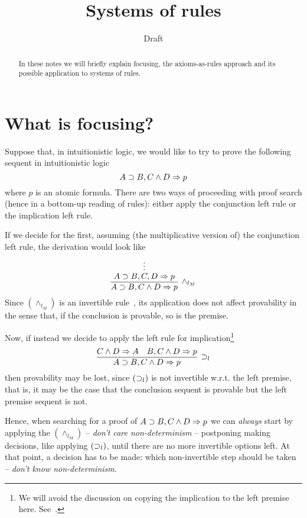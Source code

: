 \documentclass{llncs}
\title{Systems of rules}
\author{Draft}
\institute{\today}
\begin{document}
\maketitle

\begin{abstract}
In these notes we will briefly explain focusing, the axioms-as-rules approach and its possible application to systems of rules.
\end{abstract}

\section{What is focusing?}
Suppose that, in intuitionistic logic, we would like to try to prove the following sequent in intuitionistic logic
\[
A\supset B, C\wedge D\Rightarrow p
\]
where $p$ is an atomic formula. There are two ways of proceeding with proof search (hence in a bottom-up reading of rules): either apply the conjunction left rule or the implication left rule.

If we decide for the first, assuming (the multiplicative version of) the conjunction left rule, the derivation would look like
\[
\infer[\wedge_{l_M}]{A\iimp B, C\wedge D\seq p}
{\deduce{A\iimp B, C, D\seq p}{
\deduce{}{\vdots}}}
\] 
Since $(\wedge_{l_M})$ is an invertible rule~\cite{troelstra00book}, its application does not affect provability in the sense that, if the conclusion is provable, so is the premise.

Now, if instead we decide to apply the left rule for implication\footnote{We will avoid the discussion on copying the  implication to the left premise here. See~\cite{DBLP:journals/jsyml/Dyckhoff92}.}
\[
\infer[\iimp_{l}]{A\iimp B, C\wedge D\seq p}{C\wedge D\seq A & B, C\wedge D\seq p}
\] 
then provability may be lost, since $(\supset_{l})$ is not invertible w.r.t. the left premise, that is, it may be the case that the conclusion sequent is provable but the left premise sequent is not.

Hence, when  searching for a proof of $A\supset B, C\wedge D\Rightarrow p$ we can {\em always} start by applying the $(\wedge_{l_M})$ --  {\em don't care non-determinism} -- postponing making decisions, like applying $(\supset_{l})$, until there are no more invertible options left. At that point, a decision has to be made: which non-invertible step should be taken --  {\em don't know non-determinism}. 
\end{document}
